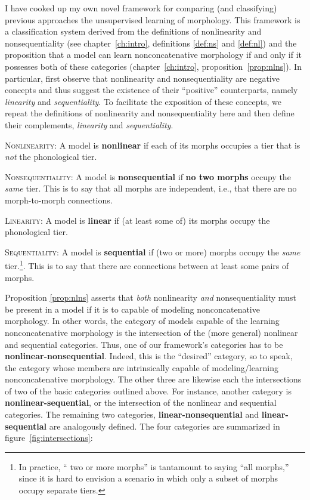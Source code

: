 I have cooked up my own novel framework for comparing (and classifying)
previous approaches
the unsupervised learning of morphology. This framework is a classification 
system derived from the definitions of nonlinearity and nonsequentiality 
(see chapter~\ref{ch:intro}, definitions \ref{def:ns} and \ref{def:nl}) 
and the proposition that 
a model can learn nonconcatenative morphology if and only if it 
possesses both of these categories (chapter~\ref{ch:intro}, 
proposition~\ref{prop:nlns}). In particular, first observe that nonlinearity 
and nonsequentiality are negative concepts and thus suggest the existence 
of their ``positive'' counterparts, namely \emph{linearity} and 
\emph{sequentiality}. To facilitate the exposition of these concepts, we 
repeat the definitions of nonlinearity and nonsequentiality here and 
then define their complements, \emph{linearity} and \emph{sequentiality}.
	\begin{definition}\label{def:nl}{\textsc{Nonlinearity}}: A model is 
	\textbf{nonlinear} if each of its morphs occupies a tier that is \emph{not} the phonological tier.
	\end{definition}
	\begin{definition}\label{def:ns}{\textsc{Nonsequentiality}}: 
	A model is \textbf{nonsequential} if \textbf{no two morphs} occupy the \emph{same} tier. This is to say that all morphs are independent, i.e., that there are no morph-to-morph connections. 
	\end{definition}
	\begin{definition}\label{def:l}{\textsc{Linearity}}:
	A model is \textbf{linear} if (at least some of) its morphs occupy the phonological tier.
	\end{definition}
	\begin{definition}\label{def:s}{\textsc{Sequentiality}}:
A model is \textbf{sequential} if (two or more) morphs occupy the \emph{same} tier.\footnote{In practice, `` two or more morphs'' is tantamount to saying ``all morphs,'' since it is hard to envision a scenario in which only a subset of morphs occupy separate tiers.}. This is to say that there are connections between at least some pairs of morphs.
	\end{definition}

Proposition \ref{prop:nlns} asserts that \emph{both} nonlinearity \emph{and} nonsequentiality
must be present in a model if it is to capable of modeling nonconcatenative morphology.
 In other words, the category of models capable of the learning nonconcatenative 
 morphology is  the intersection of the (more general) nonlinear and 
 sequential categories. Thus, one of our framework's categories has to be 
 \textbf{nonlinear-nonsequential}. Indeed, this is the ``desired'' category, 
 so to speak, the category whose members are intrinsically capable of modeling/learning
 nonconcatenative morphology. The other three are likewise each the intersections 
 of two of the basic categories outlined above.  For instance, another category is \textbf{nonlinear-sequential}, 
 or the intersection of the nonlinear and sequential categories. The remaining two categories, 
 \textbf{linear-nonsequential} and \textbf{linear-sequential} are analogously defined. The four categories are summarized in figure~\ref{fig:intersections}:

